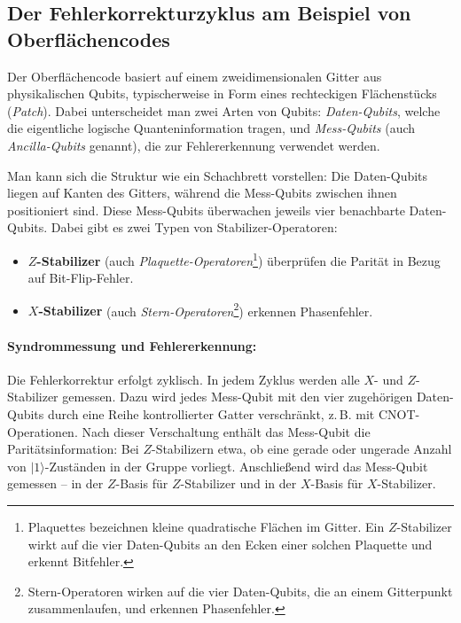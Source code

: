 \subsection{Der Fehlerkorrekturzyklus am Beispiel von Oberflächencodes}

Der Oberflächencode basiert auf einem zweidimensionalen Gitter aus physikalischen Qubits, typischerweise in Form eines rechteckigen Flächenstücks (\emph{Patch}). Dabei unterscheidet man zwei Arten von Qubits: \emph{Daten-Qubits}, welche die eigentliche logische Quanteninformation tragen, und \emph{Mess-Qubits} (auch \emph{Ancilla-Qubits} genannt), die zur Fehlererkennung verwendet werden.

Man kann sich die Struktur wie ein Schachbrett vorstellen: Die Daten-Qubits liegen auf Kanten des Gitters, während die Mess-Qubits zwischen ihnen positioniert sind. Diese Mess-Qubits überwachen jeweils vier benachbarte Daten-Qubits. Dabei gibt es zwei Typen von Stabilizer-Operatoren:
\begin{itemize}
  \item \textbf{\(Z\)-Stabilizer} (auch \emph{Plaquette-Operatoren}\footnote{Plaquettes bezeichnen kleine quadratische Flächen im Gitter. Ein \(Z\)-Stabilizer wirkt auf die vier Daten-Qubits an den Ecken einer solchen Plaquette und erkennt Bitfehler.}) überprüfen die Parität in Bezug auf Bit-Flip-Fehler.
  \item \textbf{\(X\)-Stabilizer} (auch \emph{Stern-Operatoren}\footnote{Stern-Operatoren wirken auf die vier Daten-Qubits, die an einem Gitterpunkt zusammenlaufen, und erkennen Phasenfehler.}) erkennen Phasenfehler.
\end{itemize}

\paragraph{Syndrommessung und Fehlererkennung:}

Die Fehlerkorrektur erfolgt zyklisch. In jedem Zyklus werden alle \(X\)- und \(Z\)-Stabilizer gemessen. Dazu wird jedes Mess-Qubit mit den vier zugehörigen Daten-Qubits durch eine Reihe kontrollierter Gatter verschränkt, z.\,B. mit CNOT-Operationen. Nach dieser Verschaltung enthält das Mess-Qubit die Paritätsinformation: Bei \(Z\)-Stabilizern etwa, ob eine gerade oder ungerade Anzahl von \( |1\rangle \)-Zuständen in der Gruppe vorliegt. Anschließend wird das Mess-Qubit gemessen – in der \(Z\)-Basis für \(Z\)-Stabilizer und in der \(X\)-Basis für \(X\)-Stabilizer.

